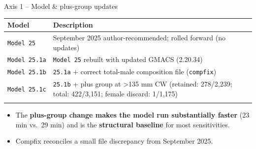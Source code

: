 \documentclass[
  10pt,
  ignorenonframetext,
  aspectratio=169,
]{beamer}
\providecommand{\tightlist}{%
  \setlength{\itemsep}{0pt}\setlength{\parskip}{0pt}}
\begin{document}
\begin{frame}[fragile]{Axis 1 -- Model \& plus-group updates}
\label{axis-1-model-plus-group-updates}
\small

\begin{longtable}[]{@{}
  >{\raggedright\arraybackslash}p{}
  >{\raggedright\arraybackslash}p{}@{}}
\toprule\noalign{}
\begin{minipage}[b]{\linewidth}\raggedright
Model
\end{minipage} & \begin{minipage}[b]{\linewidth}\raggedright
Description
\end{minipage} \\
\midrule\noalign{}
\endhead
\texttt{Model\ 25} & September 2025 author-recommended; rolled forward
(no updates) \\
\texttt{Model\ 25.1a} & \texttt{Model\ 25} rebuilt with updated GMACS
(2.20.34) \\
\texttt{Model\ 25.1b} & \texttt{25.1a} + correct total-male composition
file (\texttt{compfix}) \\
\texttt{Model\ 25.1c} & \texttt{25.1b} + plus group at \textgreater135
mm CW (retained: 278/2,239; total: 422/3,151; female discard:
1/1,175) \\
\bottomrule\noalign{}
\end{longtable}

\medskip

\begin{itemize}
\tightlist
\item
  The \textbf{plus-group change makes the model run substantially
  faster} (23 min vs.~29 min) and is the \textbf{structural baseline}
  for most sensitivities.
\item
  Compfix reconciles a small file discrepancy from September 2025.
\end{itemize}
\end{frame}
\end{document}
